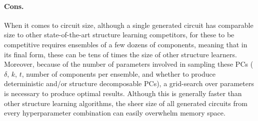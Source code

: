 \paragraph{Cons.} When it comes to circuit size, although a single  generated circuit
has comparable size to other state-of-the-art structure learning competitors, for these to be
competitive requires ensembles of a few dozens of components, meaning that in its final form, these
can be tens of times the size of other structure learners. Moreover, because of the number of
parameters involved in sampling these PCs ($\delta$, $k$, $t$, number of components per ensemble,
and whether to produce deterministic and/or structure decomposable PCs), a grid-search over
parameters is necessary to produce optimal results. Although this is generally faster than other
structure learning algorithms, the sheer size of all generated circuits from every hyperparameter
combination can easily overwhelm memory space.

